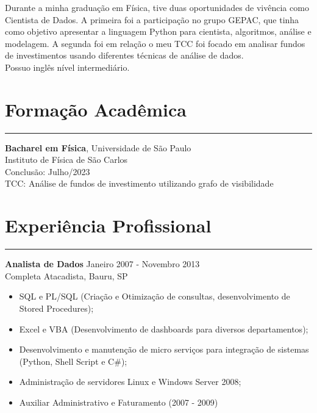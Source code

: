 \documentclass[10pt]{article}
\begin{document}
Durante a minha graduação em Física, tive duas oportunidades de vivência como Cientista de Dados. A primeira foi a participação no grupo GEPAC, que tinha como objetivo apresentar a linguagem Python para cientista, algoritmos, análise e modelagem. A segunda foi em relação o meu TCC foi focado em analisar fundos de investimentos usando diferentes técnicas de análise de dados.
\\

Possuo inglês nível intermediário.

\vspace{-7pt}

\section*{Formação Acadêmica}
\vspace{-15pt}
\rule{\linewidth}{1pt}

{\bf Bacharel em Física}, Universidade de São Paulo \\
Instituto de Física de São Carlos \\
Conclusão: Julho/2023 \\
TCC: Análise de fundos de investimento utilizando grafo de visibilidade

\vspace{-5pt}
 
\section*{Experiência Profissional}
\vspace{-15pt}
\rule{\linewidth}{1pt}

{\bf Analista de Dados} \hfill  Janeiro 2007 - Novembro 2013\\
Completa Atacadista, Bauru, SP

\begin{itemize} \itemsep -2pt %
\item SQL e PL/SQL (Criação e Otimização de consultas, desenvolvimento de Stored Procedures);
\item Excel e VBA (Desenvolvimento de dashboards para diversos departamentos);
\item Desenvolvimento e manutenção de micro serviços para integração de sistemas (Python, Shell Script e C\#);
\item Administração de servidores Linux e Windows Server 2008;
\item Auxiliar Administrativo e Faturamento (2007 - 2009)
\end{itemize}
\end{document}
